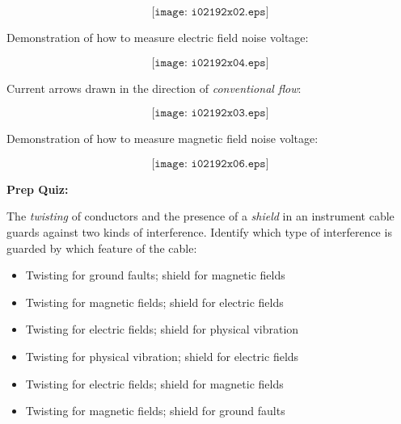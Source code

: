 $$\texttt{[image: i02192x02.eps]}$$

\filbreak

Demonstration of how to measure electric field noise voltage:

$$\texttt{[image: i02192x04.eps]}$$







Current arrows drawn in the direction of {\it conventional flow}:

$$\texttt{[image: i02192x03.eps]}$$

\filbreak

Demonstration of how to measure magnetic field noise voltage:

$$\texttt{[image: i02192x06.eps]}$$













\vfil \eject

\noindent
{\bf Prep Quiz:}

The {\it twisting} of conductors and the presence of a {\it shield} in an instrument cable guards against two kinds of interference.  Identify which type of interference is guarded by which feature of the cable:

\begin{itemize}
\item{} Twisting for ground faults; shield for magnetic fields
\vskip 5pt 
\item{} Twisting for magnetic fields; shield for electric fields
\vskip 5pt 
\item{} Twisting for electric fields; shield for physical vibration
\vskip 5pt 
\item{} Twisting for physical vibration; shield for electric fields  
\vskip 5pt 
\item{} Twisting for electric fields; shield for magnetic fields 
\vskip 5pt 
\item{} Twisting for magnetic fields; shield for ground faults 
\end{itemize}





